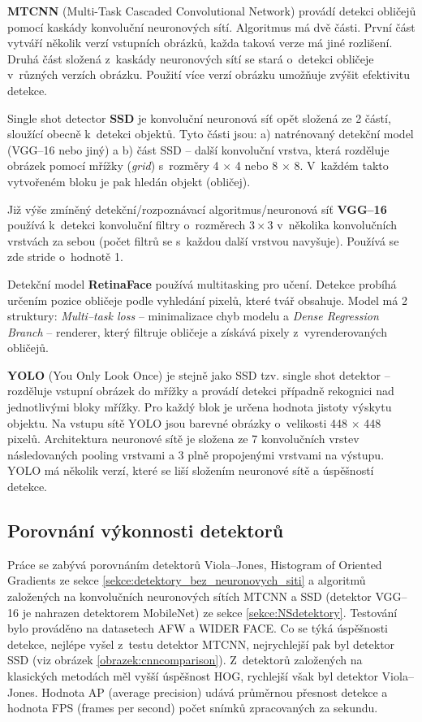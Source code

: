 \textbf{MTCNN} (Multi-Task Cascaded Convolutional Network) \cite{fdCNNComparison, MTCNN} provádí detekci obličejů pomocí kaskády konvoluční neuronových sítí. Algoritmus má dvě části. První část vytváří několik verzí vstupních obrázků, každa taková verze má jiné rozlišení. Druhá část složená z~kaskády neuronových sítí se stará o~detekci obličeje v~různých verzích obrázku. Použití více verzí obrázku umožňuje zvýšit efektivitu detekce.

Single shot detector \textbf{SSD} \cite{ssd} je konvoluční neuronová síť opět složená ze 2 částí, sloužící obecně k~detekci objektů. Tyto části jsou: a) natrénovaný detekční model (VGG--16 nebo jiný) a b) část SSD -- další konvoluční vrstva, která rozděluje obrázek pomocí mřížky (\emph{grid}) s~rozměry 4 $\times$ 4 nebo 8 $\times$ 8. V~každém takto vytvořeném bloku je pak hledán objekt (obličej).

Již výše zmíněný detekční/rozpoznávací algoritmus/neuronová síť \textbf{VGG--16} \cite{vgg-16} používá k~detekci konvoluční filtry o~rozměrech $3 \times 3$ v~několika konvolučních vrstvách za sebou (počet filtrů se s~každou další vrstvou navyšuje). Používá se zde stride o~hodnotě 1.

Detekční model \textbf{RetinaFace} \cite{lowLightFdReview} používá multitasking pro učení. Detekce probíhá určením pozice obličeje podle vyhledání pixelů, které tvář obsahuje. Model má 2 struktury: \emph{Multi--task loss} -- minimalizace chyb modelu a \emph{Dense Regression Branch} -- renderer, který filtruje obličeje a získává pixely z~vyrenderovaných obličejů.

\textbf{YOLO} (You Only Look Once) \cite{yolo} je stejně jako SSD tzv. single shot detektor -- rozděluje vstupní obrázek do mřížky a provádí detekci případně rekognici nad jednotlivými bloky mřížky. Pro každý blok je určena hodnota jistoty výskytu objektu. Na vstupu sítě YOLO jsou barevné obrázky o~velikosti 448 $\times$ 448 pixelů. Architektura neuronové sítě je složena ze 7 konvolučních vrstev následovaných pooling vrstvami a 3 plně propojenými vrstvami na výstupu.
YOLO má několik verzí, které se liší složením neuronové sítě a úspěšností detekce.

\subsection*{Porovnání výkonnosti detektorů}
Práce \cite{fdCNNComparison} se zabývá porovnáním detektorů Viola--Jones, Histogram of Oriented Gradients ze sekce \ref{sekce:detektory_bez_neuronovych_siti} a algoritmů založených na konvolučních neuronových sítích MTCNN a SSD (detektor VGG--16 je nahrazen detektorem MobileNet) ze sekce \ref{sekce:NSdetektory}. Testování bylo prováděno na datasetech AFW a WIDER FACE. Co se týká úspěšnosti detekce, nejlépe vyšel z~testu detektor MTCNN, nejrychlejší pak byl detektor SSD (viz obrázek \ref{obrazek:cnncomparison}). Z~detektorů založených na klasických metodách měl vyšší úspěšnost HOG, rychlejší však byl detektor Viola--Jones. Hodnota AP (average precision) udává průměrnou přesnost detekce a hodnota FPS (frames per second) počet snímků zpracovaných za sekundu.


